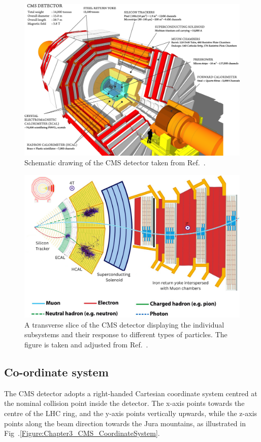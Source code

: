 \begin{figure}[h]
\centering
\includegraphics[width= 1\textwidth]{Figures/Chapter3/CMS_Detector.png}
\caption{Schematic drawing of the CMS detector taken from Ref.~\cite{CMS_Detector_Run3}.}
\label{Figure:Chapter3_CMS_schematic}
\end{figure}

\begin{figure}[h]
\centering
\includegraphics[width= 1\textwidth]{Figures/Chapter3/CMS_Detector_Slice.pdf}
\caption{A transverse slice of the CMS detector displaying the individual subsystems and their response to different types of particles. The figure is taken and adjusted from Ref.~\cite{CMS_Detector_Slice}.}
\label{Figure:Chapter3_CMS_slice}
\end{figure}

\subsection{Co-ordinate system}
The CMS detector adopts a right-handed Cartesian coordinate system centred at the nominal collision point inside the detector. The x-axis points towards the centre of the LHC ring, and the y-axis points vertically upwards, while the z-axis points along the beam direction towards the Jura mountains, as illustrated in Fig~.\ref{Figure:Chapter3_CMS_CoordinateSystem}.

